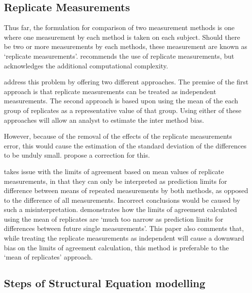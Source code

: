 \documentclass[12pt, a4paper]{report}
\theoremstyle{plain}
\theoremstyle{definition}
\theoremstyle{remark}
\begin{document}
	
	
	
	
	
	\subsection{Replicate Measurements}
	
	Thus far, the formulation for comparison of two measurement methods is one where one measurement by each method is taken on	each subject. Should there be two or more measurements by each methods, these measurement are known as `replicate measurements'.
	\citet{BXC2008} recommends the use of replicate measurements, but acknowledges the additional computational complexity.
	
	\citet*{BA86} address this problem by offering two different approaches. The premise of the first approach is that replicate
	measurements can be treated as independent measurements. The second approach is based upon using the mean of the each group of
	replicates as a representative value of that group. Using either
	of these approaches will allow an analyst to estimate the inter
	method bias.
	
	
	However, because of the removal of the effects of the replicate
	measurements error, this would cause the estimation of the
	standard deviation of the differences to be unduly small.
	\citet*{BA86} propose a correction for this.
	
	\citet{BXC2008} takes issue with the limits of agreement based on
	mean values of replicate measurements, in that they can only be interpreted as prediction
	limits for difference between means of repeated measurements by
	both methods, as opposed to the difference of all measurements.
	Incorrect conclusions would be caused by such a misinterpretation.
	\citet{BXC2008} demonstrates how the limits of agreement
	calculated using the mean of replicates are `much too narrow as
	prediction limits for differences between future single
	measurements'. This paper also comments that, while treating the
	replicate measurements as independent will cause a downward bias
	on the limits of agreement calculation, this method is preferable
	to the `mean of replicates' approach.
	
	
	\subsection{Steps of Structural Equation modelling}
	
\end{document}
